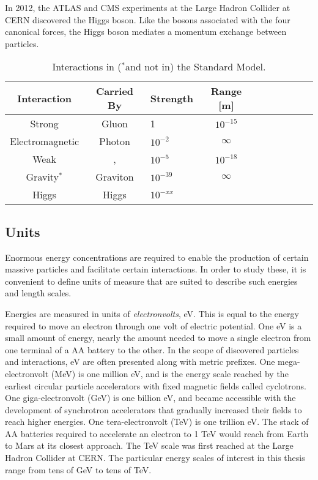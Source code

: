 In 2012, the ATLAS and CMS experiments at the Large Hadron Collider at CERN discovered the Higgs boson.
Like the bosons associated with the four canonical forces, the Higgs boson mediates a momentum exchange between particles.

\begin{table}[htp]
\begin{center}
\caption{Interactions in ($^*$and not in) the Standard Model. \cite{robinson}}
{\footnotesize
\begin{tabular}{c c l c c c c c c c}
\toprule
Interaction      & Carried By &  Strength   & Range [m]  \\
\midrule
Strong           & Gluon      &  1          & $10^{-15}$ \\
Electromagnetic  & Photon     &  $10^{-2}$  & $\infty$   \\
Weak             & \W, \Z     &  $10^{-5}$  & $10^{-18}$ \\
Gravity$^*$      & Graviton   &  $10^{-39}$ & $\infty$   \\
Higgs            & Higgs      &  $10^{-xx}$ &    \\
\bottomrule      
\end{tabular}
}
\label{tab:forces}
\end{center}
\end{table}

\subsection{Units}

Enormous energy concentrations are required to enable the production of certain massive particles and facilitate certain interactions.
In order to study these, it is convenient to define units of measure that are suited to describe such energies and length scales.

Energies are measured in units of \emph{electronvolts}, eV.
This is equal to the energy required to move an electron through one volt of electric potential.
One eV is a small amount of energy, nearly the amount needed to move a single electron from one terminal of a AA battery to the other.
In the scope of discovered particles and interactions, eV are often presented along with metric prefixes.
One mega-electronvolt (MeV) is one million eV, and is the energy scale reached by the earliest circular particle accelerators with fixed magnetic fields called cyclotrons. 
One giga-electronvolt (GeV) is one billion eV, and became accessible with the development of synchrotron accelerators that gradually increased their fields to reach higher energies.
One tera-electronvolt (TeV) is one trillion eV.
The stack of AA batteries required to accelerate an electron to 1 TeV would reach from Earth to Mars at its closest approach.
The TeV scale was first reached at the Large Hadron Collider at CERN.
The particular energy scales of interest in this thesis range from tens of GeV to tens of TeV.

